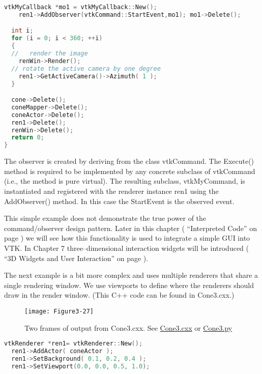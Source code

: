 \begin{description}[leftmargin=0cm,labelindent=0cm]
\begin{lstlisting}[language=C++, caption={}, escapechar=\$]
  vtkMyCallback *mo1 = vtkMyCallback::New();
    ren1->AddObserver(vtkCommand::StartEvent,mo1); mo1->Delete();

  int i;
  for (i = 0; i < 360; ++i)
  {
  //   render the image
    renWin->Render();
  // rotate the active camera by one degree
    ren1->GetActiveCamera()->Azimuth( 1 );
  }

  cone->Delete();
  coneMapper->Delete();
  coneActor->Delete();
  ren1->Delete();
  renWin->Delete();
  return 0;
}
\end{lstlisting}

The observer is created by deriving from the class vtkCommand. The Execute() method is required to be implemented by any concrete subclass of vtkCommand (i.e., the method is pure virtual). The resulting subclass, vtkMyCommand, is instantiated and registered with the renderer instance ren1 using the AddObserver() method. In this case the StartEvent is the observed event.

This simple example does not demonstrate the true power of the command/observer design pattern. Later in this chapter ( ``Interpreted Code'' on page \pageref{subsec:examples_interpreted_code} ) we will see how this functionality is used to integrate a simple GUI into VTK. In Chapter 7 three--dimensional interaction widgets will be introduced ( ``3D Widgets and User Interaction''  on page \pageref{sec:3D_widgets_user_interaction} ).

\item[Creating Multiple Renderers.]

The next example is a bit more complex and uses multiple renderers that share a single rendering window. We use viewports to define where the renderers should draw in the render window. (This C++ code can be found in Cone3.cxx.)

\begin{figure}[!htb]
  \centering
  \texttt{[image: Figure3-27]}\\
  \caption{Two frames of output from Cone3.cxx. See  \href{https://lorensen.github.io/VTKExamples/site/Cxx/Rendering/Cone3/}{Cone3.cxx} or \href{https://lorensen.github.io/VTKExamples/site/Python/Rendering/Cone3/}{Cone3.py}}\label{fig:Figure3-27}
\end{figure}

\begin{lstlisting}[language=C++, caption={Cone3.cxx}]
vtkRenderer *ren1= vtkRenderer::New();
  ren1->AddActor( coneActor );
  ren1->SetBackground( 0.1, 0.2, 0.4 );
  ren1->SetViewport(0.0, 0.0, 0.5, 1.0);


\end{lstlisting}
\end{description}
